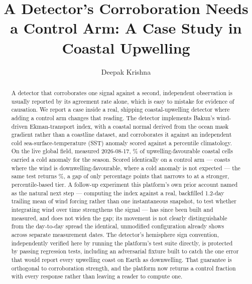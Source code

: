 \documentclass[runningheads]{llncs}
\begin{document}
\title{A Detector's Corroboration Needs a Control Arm: A Case Study in
Coastal Upwelling}


\author{Deepak Krishna}

\maketitle

\begin{abstract}
A detector that corroborates one signal against a second, independent
observation is usually reported by its agreement rate alone, which is easy
to mistake for evidence of causation. We report a case inside a real,
shipping coastal-upwelling detector where adding a control arm changes that
reading. The detector implements Bakun's wind-driven Ekman-transport index,
with a coastal normal derived from the ocean mask gradient rather than a
coastline dataset, and corroborates it against an independent cold
sea-surface-temperature (SST) anomaly scored against a percentile
climatology. On the live global field, measured 2026-08-17,
\UpwellFavourWeak{}\% of upwelling-favourable coastal cells carried a cold
anomaly for the season. Scored identically on a control arm --- coasts where
the wind is downwelling-favourable, where a cold anomaly is not expected ---
the same test returns \UpwellControlWeak{}\%, a gap of only
\UpwellGapWeak{} percentage points that narrows to \UpwellGapStrong{} at a
stronger, percentile-based tier. A follow-up experiment this platform's own
prior account named as the natural next step --- computing the index against
a real, backfilled 1.2-day trailing mean of wind forcing rather than one
instantaneous snapshot, to test whether integrating wind over time
strengthens the signal --- has since been built and measured, and does not
widen the gap; its movement is not clearly distinguishable from the
day-to-day spread the identical, unmodified configuration already shows
across separate measurement dates. The detector's hemisphere sign
convention, independently verified here by running the platform's test
suite directly, is protected by \NTotalUpwellingTests{} passing regression
tests, including an adversarial fixture built to catch the one error that
would report every upwelling coast on Earth as downwelling. That guarantee
is orthogonal to corroboration strength, and the platform now returns a
control fraction with every response rather than leaving a reader to
compute one.
\end{abstract}
\end{document}
